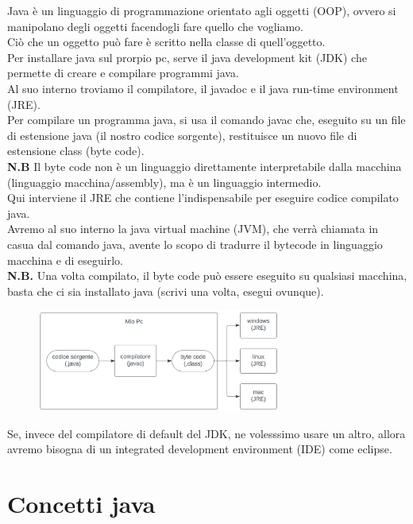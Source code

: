 \documentclass{article}
\begin{document}
Java è un linguaggio di programmazione orientato agli oggetti (OOP), ovvero si manipolano degli oggetti facendogli fare quello che vogliamo.\\
Ciò che un oggetto può fare è scritto nella classe di quell'oggetto.\\
Per installare java sul prorpio pc, serve il java development kit (JDK) che permette di creare e compilare programmi java.\\
Al suo interno troviamo il compilatore, il javadoc e il java run-time environment (JRE).\\
Per compilare un programma java, si usa il comando javac che, eseguito su un file di estensione java (il nostro codice sorgente), restituisce un nuovo file di estensione class (byte code).\\
\textbf{N.B} Il byte code non è un linguaggio direttamente interpretabile dalla macchina (linguaggio macchina/assembly), ma è un linguaggio intermedio.\\
Qui interviene il JRE che contiene l'indispensabile per eseguire codice compilato java.\\
Avremo al suo interno la java virtual machine (JVM), che verrà chiamata in casua dal comando java, avente lo scopo di tradurre il bytecode in linguaggio macchina e di eseguirlo.\\
\textbf{N.B.} Una volta compilato, il byte code può essere eseguito su qualsiasi macchina, basta che ci sia installato java (scrivi una volta, esegui ovunque).\\

\begin{figure}[h]
	\centering
	\includegraphics[width=8cm]{processo_esecuzione_java}
\end{figure}

Se, invece del compilatore di default del JDK, ne volesssimo usare un altro, allora avremo bisogna di un integrated development environment (IDE) come eclipse.\\

\section*{Concetti java}
\end{document}
